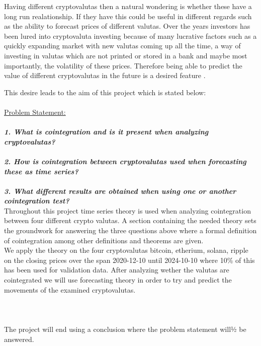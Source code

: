 Having different cryptovalutas then a natural wondering is whether these have a long run realationship. If they have this could be useful in different regards such as the ability to forecast prices of different valutas. Over the years investors has been lured into cryptovaluta investing because of many lucrative factors such as a quickly expanding market with new valutas coming up all the time, a way of investing in valutas which are not printed or stored in a bank and maybe most importantly, the volatility of these prices. Therefore being able to predict the value of different cryptovalutas in the future is a desired feature \cite{investopedia.}.

\newpage

This desire leads to the aim of this project which is stated below:\\\\
\noindent\makebox[\linewidth]{\rule{\textwidth}{0.4pt}}
\underline{Problem Statement:}\\\\
\textbf{\textit{1. What is cointegration and is it present when analyzing cryptovalutas?}}\\\\
\textbf{\textit{2. How is cointegration between cryptovalutas used when forecasting these as time series?}}\\\\
\textbf{\textit{3. What different results are obtained when using one or another cointegration test?}}\\
\noindent\makebox[\linewidth]{\rule{\textwidth}{0.4pt}}
Throughout this project time series theory is used when analyzing cointegration between four different crypto valutas. A section containing the needed theory sets the groundwork for answering the three questions above where a formal definition of cointegration among other definitions and theorems are given.\\
We apply the theory on the four cryptovalutas bitcoin, etherium, solana, ripple on the closing prices over the span 2020-12-10 until 2024-10-10 where 10\% of this has been used for validation data. After analyzing wether the valutas are cointegrated we will use forecasting theory in order to try and predict the movements of the examined cryptovalutas.\\\\\\\\
The project will end using a conclusion where the problem statement will½ be answered.



